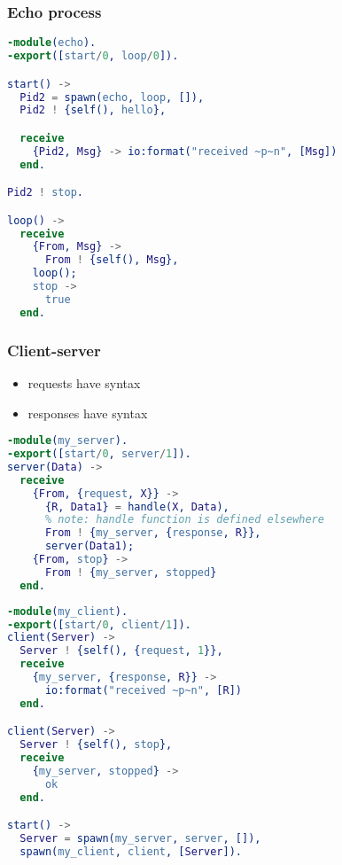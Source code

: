 \documentclass[a4paper,landscape,10pt]{article}
\begin{document}
\begin{multicols*}{2}
  \subsubsection{Echo process}

  \begin{lstlisting}[language=Erlang]
-module(echo).
-export([start/0, loop/0]).

start() ->
  Pid2 = spawn(echo, loop, []),
  Pid2 ! {self(), hello},

  receive
    {Pid2, Msg} -> io:format("received ~p~n", [Msg])
  end.

Pid2 ! stop.

loop() ->
  receive
    {From, Msg} ->
      From ! {self(), Msg},
    loop();
    stop ->
      true
  end.
\end{lstlisting}

  \subsubsection{Client-server}

  \begin{itemize}
    \item requests have syntax 
    \item responses have syntax 
  \end{itemize}

  \begin{lstlisting}[language=Erlang]
%% this snippet contains the server code
-module(my_server).
-export([start/0, server/1]).
server(Data) ->
  receive
    {From, {request, X}} ->
      {R, Data1} = handle(X, Data),
      % note: handle function is defined elsewhere
      From ! {my_server, {response, R}},
      server(Data1);
    {From, stop} ->
      From ! {my_server, stopped}
  end.
\end{lstlisting}

  \begin{lstlisting}[language=Erlang]
%% this snippet contains the client code
-module(my_client).
-export([start/0, client/1]).
client(Server) ->
  Server ! {self(), {request, 1}},
  receive
    {my_server, {response, R}} ->
      io:format("received ~p~n", [R])
  end.

client(Server) ->
  Server ! {self(), stop},
  receive
    {my_server, stopped} ->
      ok
  end.

start() ->
  Server = spawn(my_server, server, []),
  spawn(my_client, client, [Server]).
\end{lstlisting}

\end{multicols*}

\clearpage
\end{document}
